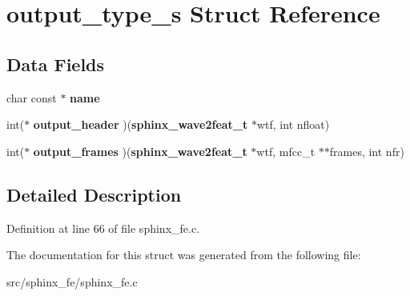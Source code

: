 \section{output\-\_\-type\-\_\-s Struct Reference}
\label{structoutput__type__s}
\subsection*{Data Fields}
\begin{DoxyCompactItemize}
\item 
char const $\ast$ {\bfseries name}\label{structoutput__type__s_a978f479360a30a64f9e151d75ec2bb4b}

\item 
int($\ast$ {\bfseries output\-\_\-header} )({\bf sphinx\-\_\-wave2feat\-\_\-t} $\ast$wtf, int nfloat)\label{structoutput__type__s_ad9df53f9f81d98e006e7f5b815a6bafa}

\item 
int($\ast$ {\bfseries output\-\_\-frames} )({\bf sphinx\-\_\-wave2feat\-\_\-t} $\ast$wtf, mfcc\-\_\-t $\ast$$\ast$frames, int nfr)\label{structoutput__type__s_a23a315808fdbf3d87ac037e5245a60d4}

\end{DoxyCompactItemize}


\subsection{Detailed Description}


Definition at line 66 of file sphinx\-\_\-fe.\-c.



The documentation for this struct was generated from the following file\-:\begin{DoxyCompactItemize}
\item 
src/sphinx\-\_\-fe/sphinx\-\_\-fe.\-c\end{DoxyCompactItemize}
